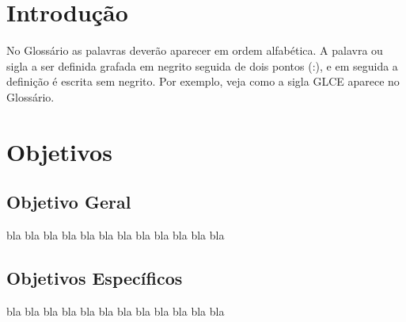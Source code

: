 \documentclass[12pt,a4paper,espaco=umemeio,noindentfirst,oneside,openany,tocpage=plain,pnumromarab,ruledheader,time,anapcustomindent]{sty/abnt}
\providecommand{\printnomenclature}{\printglossary}
\begin{document}
\listadefiguras

\listadetabelas

\printnomenclature

\sumario



\chapter{Introdução} %

No Glossário as palavras deverão aparecer em ordem alfabética. A
palavra ou sigla a ser definida grafada em negrito seguida de dois
pontos (:), e em seguida a definição é escrita sem negrito. Por
exemplo, veja como a sigla GLCE
aparece no Glossário.


\chapter{Objetivos}

\section{Objetivo Geral}

bla bla bla bla bla bla bla bla bla bla bla bla

\section{Objetivos Específicos}

bla bla bla bla bla bla bla bla bla bla bla bla
\end{document}
